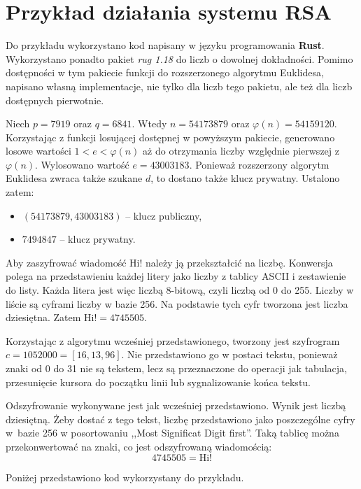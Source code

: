 \documentclass[12pt,twoside,a4]{mwbk}
\theoremstyle{definition}
\begin{document}
\section{Przykład działania systemu RSA}
Do przykładu wykorzystano kod napisany w języku programowania \textbf{Rust}. Wykorzystano ponadto pakiet \textit{rug 1.18} do liczb o dowolnej dokładności. Pomimo dostępności w tym pakiecie funkcji do rozszerzonego algorytmu Euklidesa, napisano własną implementacje, nie tylko dla liczb tego pakietu, ale też dla liczb dostępnych pierwotnie. \\ \par
Niech $p = 7919$ oraz $q = 6841$. Wtedy $n = 54173879$ oraz $\varphi(n) = 54159120$. Korzystając z funkcji losującej dostępnej w powyższym pakiecie, generowano losowe wartości $1 < e < \varphi(n)$ aż do otrzymania liczby względnie pierwszej z $\varphi(n)$. Wylosowano wartość $e = 43003183$. Ponieważ rozszerzony algorytm Euklidesa zwraca także szukane $d$, to dostano także klucz prywatny. Ustalono zatem:
\begin{itemize}
\item $(54173879, 43003183)$ -- klucz publiczny,
\item $7494847$ -- klucz prywatny.
\end{itemize}

Aby zaszyfrować wiadomość Hi! należy ją przekształcić na liczbę. Konwersja polega na przedstawieniu każdej litery jako liczby z tablicy ASCII i zestawienie do listy. Każda litera jest więc liczbą 8-bitową, czyli liczbą od 0 do 255. Liczby w liście są cyframi liczby w bazie 256. Na podstawie tych cyfr tworzona jest liczba dziesiętna. Zatem $\text{Hi!} = 4745505$. \\ \par
Korzystając z algorytmu wcześniej przedstawionego, tworzony jest szyfrogram $c = 1052000 = [16,13,96]$. Nie przedstawiono go w postaci tekstu, ponieważ znaki od 0 do 31 nie są tekstem, lecz są przeznaczone do operacji jak tabulacja, przesunięcie kursora do początku linii lub sygnalizowanie końca tekstu.  \\ \par
Odszyfrowanie wykonywane jest jak wcześniej przedstawiono. Wynik jest liczbą dziesiętną. Żeby dostać z tego tekst, liczbę przedstawiono jako poszczególne cyfry w~bazie 256 w posortowaniu ,,Most Significat Digit first''. Taką tablicę można przekonwertować na znaki, co jest odszyfrowaną wiadomością:
\[ 4745505 = \text{Hi!} \]

Poniżej przedstawiono kod wykorzystany do przykładu.

\end{document}
